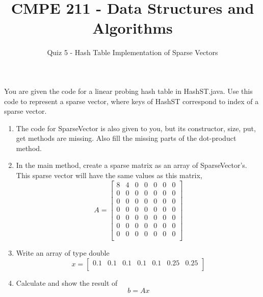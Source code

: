 \documentclass{article}
\begin{document}
\author{Quiz 5 - Hash Table Implementation of Sparse Vectors}
\title{CMPE 211 - Data Structures and Algorithms}




\date{}
\maketitle
\setcounter{secnumdepth}{0}



You are given the code for a linear probing hash table in HashST.java. Use this code to represent a sparse vector, where keys of HashST correspond to index of a sparse vector. 




\begin{enumerate}
\item 
The code for SparseVector is also given to you, but its constructor, size, put, get methods are missing. Also fill the missing parts of the dot-product method.

\item 
In the main method, create a sparse matrix as an array of SparseVector's. This sparse vector will have the same values as this matrix,
$$
A =
\begin{bmatrix}
    8     & 4 & 0 & 0 & 0  & 0 & 0\\
    0    & 0 & 0 & 0 & 0  & 0 & 0\\
     0    & 0 & 0 & 0 & 0  & 0 & 0\\
      0    & 0 & 0 & 0 & 0  & 0 & 0\\
       0    & 0 & 0 & 0 & 0  & 0 & 0\\
        0    & 0 & 0 & 0 & 0  & 0 & 0\\
         0    & 0 & 0 & 0 & 0  & 0 & 0\\
\end{bmatrix}
$$

\item 
Write an array of type double
$$
x =
\begin{bmatrix}
    0.1 & 0.1  & 0.1  & 0.1  & 0.1  & 0.25  &0.25\\
\end{bmatrix}
$$

\item 
Calculate and show the result of
$$
b = Ax 
$$
\end{enumerate}
\end{document}
